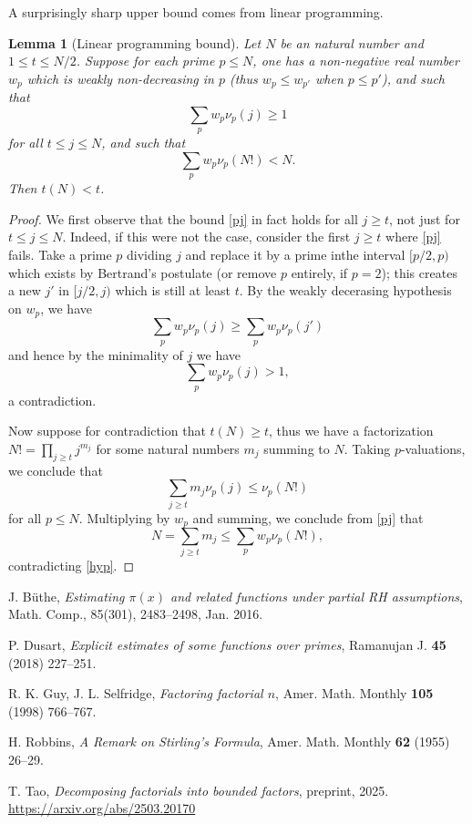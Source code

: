 \documentclass[12pt,a4paper,reqno]{amsart}
\numberwithin{equation}{section}
\theoremstyle{plain}
\newtheorem{lemma}[theorem]{Lemma}
\theoremstyle{definition}
\begin{document}
A surprisingly sharp upper bound comes from linear programming.

\begin{lemma}[Linear programming bound]\label{lp-upper}  Let $N$ be an natural number and $1 \leq t \leq N/2$.  Suppose for each prime $p \leq N$, one has a non-negative real number $w_p$ which is weakly non-decreasing in $p$ (thus $w_p \leq w_{p'}$ when $p \leq p'$), and such that
\begin{equation}\label{pj}
 \sum_p w_p \nu_p(j) \geq 1
\end{equation}
for all $t \leq j \leq N$, and such that
\begin{equation}\label{hyp}
\sum_p w_p \nu_p(N!) < N.
\end{equation}
Then $t(N) < t$.
\end{lemma}

\begin{proof}
We first observe that the bound \eqref{pj} in fact holds for all $j \geq t$, not just for $t \leq j \leq N$.  Indeed, if this were not the case, consider the first $j \geq t$ where \eqref{pj} fails.  Take a prime $p$ dividing $j$ and replace it by a prime inthe interval $[p/2,p)$ which exists by Bertrand's postulate (or remove $p$ entirely, if $p=2$); this creates a new $j'$ in $[j/2,j)$ which is still at least $t$.  By the weakly decerasing hypothesis on $w_p$, we have
$$ \sum_p w_p \nu_p(j) \geq \sum_p w_p \nu_p(j')$$
and hence by the minimality of $j$ we have
$$ \sum_p w_p \nu_p(j) > 1, $$
a contradiction.

Now suppose for contradiction that $t(N) \geq t$, thus we have a factorization $N! = \prod_{j \geq t} j^{m_j}$ for some natural numbers $m_j$ summing to $N$.  Taking $p$-valuations, we conclude that
$$ \sum_{j \geq t} m_j \nu_p(j) \leq \nu_p(N!)$$
for all $p \leq N$.  Multiplying by $w_p$ and summing, we conclude from \eqref{pj} that
$$ N = \sum_{j \geq t} m_j \leq \sum_p w_p \nu_p(N!),$$
contradicting \eqref{hyp}.
\end{proof}

\begin{thebibliography}{10}

J. B\"uthe, \emph{Estimating $\pi(x)$ and related functions under partial RH assumptions}, Math. Comp., 85(301), 2483--2498, Jan. 2016.

P. Dusart, \emph{Explicit estimates of some functions over primes}, Ramanujan J. \textbf{45} (2018) 227--251.

R. K. Guy, J. L. Selfridge, \emph{Factoring factorial $n$}, Amer. Math. Monthly \textbf{105} (1998) 766--767.

H. Robbins, \emph{A Remark on Stirling's Formula}, Amer. Math. Monthly \textbf{62} (1955) 26--29.

T. Tao, \emph{Decomposing factorials into bounded factors}, preprint, 2025. \url{https://arxiv.org/abs/2503.20170}

\end{thebibliography}
\end{document}
